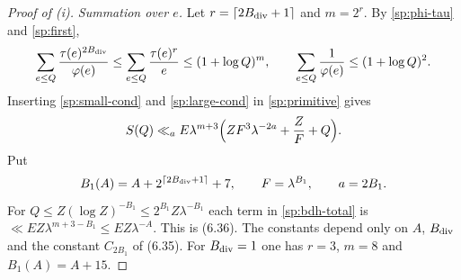 \begin{proof}[Proof of \textup{(i)}]
\emph{Summation over $e$.} Let $r=\lceil2B_{\rm div}+1\rceil$ and
$m=2^r$. By \eqref{sp:phi-tau} and \eqref{sp:first},
\[
 \sum_{e\le Q}\frac{\tau(e)^{2B_{\rm div}}}{\varphi(e)}
 \le\sum_{e\le Q}\frac{\tau(e)^r}e\le(1+\log Q)^m,\qquad
 \sum_{e\le Q}\frac1{\varphi(e)}\le(1+\log Q)^2 .
\]
Inserting \eqref{sp:small-cond} and \eqref{sp:large-cond} in
\eqref{sp:primitive} gives
\begin{equation}\label{sp:bdh-total}
 S(Q)\ll_aE\lambda^{m+3}\Bigl(ZF^3\lambda^{-2a}+\frac ZF+Q\Bigr).
\end{equation}
Put
\begin{equation}\label{sp:b1}
 B_1(A)=A+2^{\lceil2B_{\rm div}+1\rceil}+7,\qquad F=\lambda^{B_1},\qquad a=2B_1 .
\end{equation}
For $Q\le Z(\log Z)^{-B_1}\le2^{B_1}Z\lambda^{-B_1}$ each term in
\eqref{sp:bdh-total} is $\ll EZ\lambda^{m+3-B_1}\le EZ\lambda^{-A}$. This
is (6.36). The constants depend only on $A$, $B_{\rm div}$ and the constant
$C_{2B_1}$ of (6.35). For $B_{\rm div}=1$ one has $r=3$, $m=8$ and
$B_1(A)=A+15$.
\end{proof}

